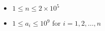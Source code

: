 \begin{itemize}
    \tightlist
    \item $1 \leq n \leq 2 \times 10^5$
    \item $1 \leq a_i \leq 10^9$ for $i = 1,2,\ldots,n$
    \end{itemize}
    